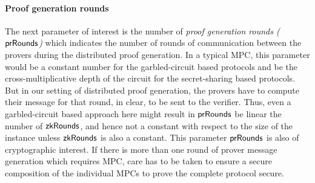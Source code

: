 
\paragraph{Proof generation rounds}
The next parameter of interest is the number of \textit{proof generation rounds ($\mathsf{prRounds}$)} which indicates the number of rounds of communication between the provers during the distributed proof generation. In a typical MPC, this parameter would be a constant number for the garbled-circuit based protocols and be the cross-multiplicative depth of the circuit for the secret-sharing based protocols. But in our setting of distributed proof generation, the provers have to compute their message for that round, in clear, to be sent to the verifier. Thus, even a garbled-circuit based approach here might result in $\mathsf{prRounds}$ be linear the number of $\mathsf{zkRounds}$, and hence not a constant with respect to the size of the instance unless $\mathsf{zkRounds}$ is also a constant. 
This parameter $\mathsf{prRounds}$ is also of cryptographic interest. If there is more than one round of prover message generation which requires MPC, care has to be taken to ensure a secure composition of the individual MPCs to prove the complete protocol secure.

